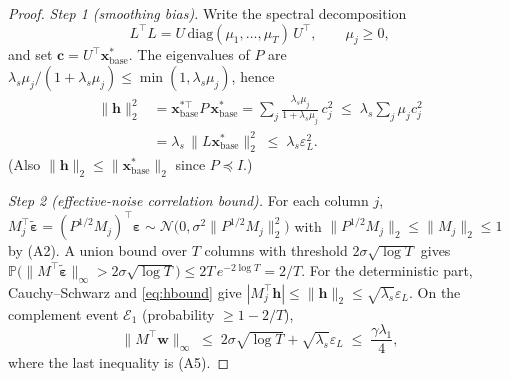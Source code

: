 \documentclass[10pt]{article} %
\theoremstyle{plain}
\theoremstyle{definition}
\begin{document}
\begin{proof}
\emph{Step 1 (smoothing bias).} Write the spectral decomposition
\begin{displaymath}
L^{\top}L = U\,\mathrm{diag}(\mu_{1},\dots,\mu_{T})\,U^{\top},
\qquad \mu_{j}\ge 0,
\end{displaymath}
and set $\mathbf{c} = U^{\top}\mathbf{x}^{*}_{\mathrm{base}}$. The eigenvalues
of $P$ are $\lambda_{s}\mu_{j}/(1+\lambda_{s}\mu_{j})
\le \min(1,\lambda_{s}\mu_{j})$, hence
\begin{align}
\|\mathbf{h}\|_{2}^{2}
&= \mathbf{x}^{*\top}_{\mathrm{base}} P\, \mathbf{x}^{*}_{\mathrm{base}}
= \sum_{j}\frac{\lambda_{s}\mu_{j}}{1+\lambda_{s}\mu_{j}}\, c_{j}^{2}
\;\le\; \lambda_{s}\sum_{j}\mu_{j} c_{j}^{2} \nonumber\\
&= \lambda_{s}\,\|L\mathbf{x}^{*}_{\mathrm{base}}\|_{2}^{2}
\;\le\; \lambda_{s}\varepsilon_{L}^{2}.
\label{eq:hbound}
\end{align}
(Also $\|\mathbf{h}\|_{2} \le
\|\mathbf{x}^{*}_{\mathrm{base}}\|_{2}$ since $P \preceq I$.)

\emph{Step 2 (effective-noise correlation bound).} For each column
$j$, $M_{j}^{\top}\tilde{\boldsymbol{\varepsilon}}
= (P^{1/2}M_{j})^{\top}\boldsymbol{\varepsilon}
\sim \mathcal{N}\bigl(0,\sigma^{2}\|P^{1/2}M_{j}\|_{2}^{2}\bigr)$ with
$\|P^{1/2}M_{j}\|_{2}\le\|M_{j}\|_{2}\le 1$ by (A2). A union bound over
$T$ columns with threshold $2\sigma\sqrt{\log T}$ gives
$\mathbb{P}\bigl(\|M^{\top}\tilde{\boldsymbol{\varepsilon}}\|_{\infty}
> 2\sigma\sqrt{\log T}\bigr) \le 2T\,e^{-2\log T} = 2/T$. For the
deterministic part, Cauchy--Schwarz and \eqref{eq:hbound} give
$|M_{j}^{\top}\mathbf{h}| \le \|\mathbf{h}\|_{2}
\le \sqrt{\lambda_{s}}\varepsilon_{L}$. On the complement event
$\mathcal{E}_{1}$ (probability $\ge 1-2/T$),
\begin{equation}
\|M^{\top}\mathbf{w}\|_{\infty}
\;\le\; 2\sigma\sqrt{\log T} + \sqrt{\lambda_{s}}\varepsilon_{L}
\;\le\; \frac{\gamma\lambda_{1}}{4},
\label{eq:corr-bound}
\end{equation}
where the last inequality is (A5).


\end{proof}
\end{document}
